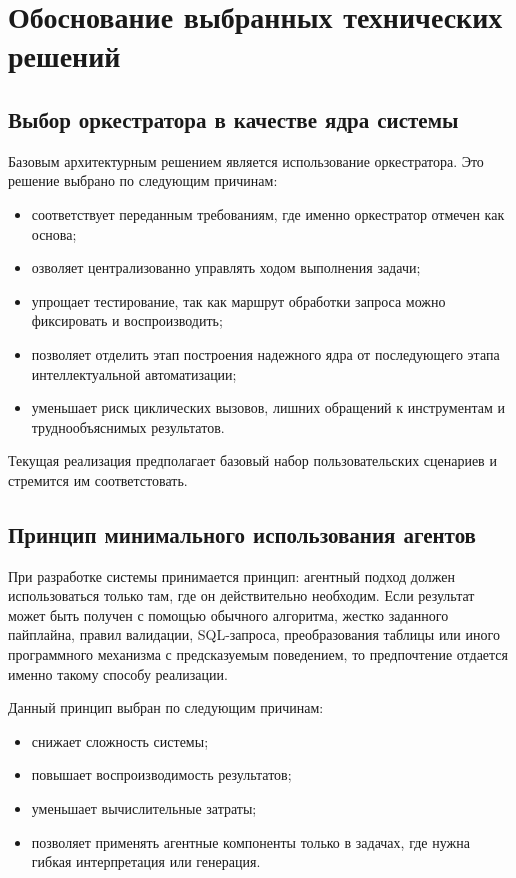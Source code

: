 \documentclass[14pt,a4paper]{extarticle}
\begin{document}
\section{Обоснование выбранных технических решений}

\subsection{Выбор оркестратора в качестве ядра системы}

Базовым архитектурным решением является использование оркестратора. Это решение выбрано по следующим причинам:
\begin{itemize}
    \item соответствует переданным требованиям, где именно оркестратор отмечен как основа;
    \item озволяет централизованно управлять ходом выполнения задачи;
    \item упрощает тестирование, так как маршрут обработки запроса можно фиксировать и воспроизводить;
    \item позволяет отделить этап построения надежного ядра от последующего этапа интеллектуальной автоматизации;
    \item уменьшает риск циклических вызовов, лишних обращений к инструментам и труднообъяснимых результатов.
\end{itemize}

Текущая реализация предполагает базовый набор пользовательских сценариев и стремится им соответстовать.

\subsection{Принцип минимального использования агентов}

При разработке системы принимается принцип: агентный подход должен использоваться только там, где он действительно необходим. Если результат может быть получен с помощью обычного алгоритма, жестко заданного пайплайна, правил валидации, SQL-запроса, преобразования таблицы или иного программного механизма с предсказуемым поведением, то предпочтение отдается именно такому способу реализации.

Данный принцип выбран по следующим причинам:
\begin{itemize}
    \item снижает сложность системы;
    \item повышает воспроизводимость результатов;
    \item уменьшает вычислительные затраты;
    \item позволяет применять агентные компоненты только в задачах, где нужна гибкая интерпретация или генерация.
\end{itemize}
\end{document}
